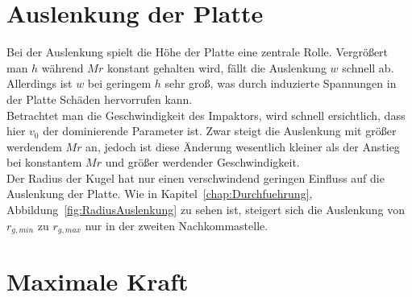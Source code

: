 \section{Auslenkung der Platte}
\label{sec:Auslenkung}

Bei der Auslenkung spielt die Höhe der Platte eine zentrale Rolle. Vergrößert man $h$ während $Mr$ konstant gehalten wird, fällt die Auslenkung $w$ schnell ab. Allerdings ist $w$ bei geringem $h$ sehr groß, was durch induzierte Spannungen in der Platte Schäden hervorrufen kann.\\
Betrachtet man die Geschwindigkeit des Impaktors, wird schnell ersichtlich, dass hier $v_{0}$ der dominierende Parameter ist. Zwar steigt die Auslenkung mit größer werdendem $Mr$ an, jedoch ist diese Änderung wesentlich kleiner als der Anstieg bei konstantem $Mr$ und größer werdender Geschwindigkeit.\\
Der Radius der Kugel hat nur einen verschwindend geringen Einfluss auf die Auslenkung der Platte. Wie in Kapitel~\ref{chap:Durchfuehrung}, Abbildung~\ref{fig:RadiusAuslenkung} zu sehen ist, steigert sich die Auslenkung von $r_{g,min}$ zu $r_{g,max}$ nur in der zweiten Nachkommastelle. \\


\section{Maximale Kraft}
\label{sec:Kraft}

